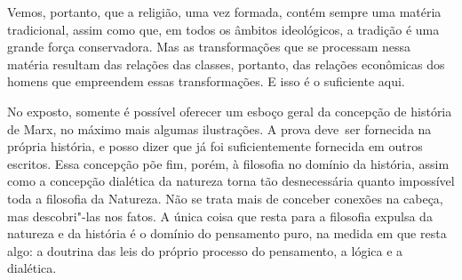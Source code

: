 Vemos, portanto, que a religião, uma vez formada, contém sempre uma
matéria tradicional, assim como que, em todos os âmbitos ideológicos, a
tradição é uma grande força conservadora. Mas as transformações que se
processam nessa matéria resultam das relações das classes, portanto,
das relações econômicas dos homens que empreendem essas transformações.
E isso é o suficiente aqui.

No exposto, somente é possível oferecer um esboço geral da concepção de
história de Marx, no máximo mais algumas ilustrações. A prova deve\est\ ser
fornecida na própria história, e posso dizer que já foi suficientemente
fornecida em outros escritos. Essa concepção põe fim, porém, à filosofia
no domínio da história, assim como a concepção dialética da natureza
torna tão desnecessária quanto impossível toda a filosofia da Natureza. %
Não se trata mais de conceber conexões na cabeça, mas descobri"-las nos
fatos. A única coisa que resta para a filosofia expulsa da natureza e da
história é o domínio do pensamento puro, na medida em que resta algo: a
doutrina das leis do próprio processo do pensamento, a lógica e a
dialética.

\asterisc

